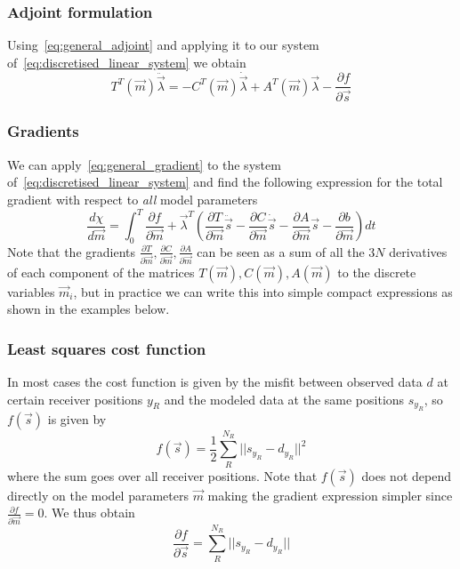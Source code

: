 \documentclass[fleqn,11pt]{SelfArx} %
\newcommand{\pder}[2][]{\frac{\partial#1}{\partial#2}}
\theoremstyle{definition}
\begin{document}
\subsubsection{Adjoint formulation}
Using~\cref{eq:general_adjoint} and applying it to our system of~\cref{eq:discretised_linear_system} we obtain
\begin{equation}\label{eq:adjoint_discretised_linear}
T^T\left(\vec{m}\right) \ddot{\vec{\lambda}} = -C^T\left(\vec{m}\right)\dot{\vec{\lambda}} + A^T\left(\vec{m}\right) \vec{\lambda} - \pder[f]{\vec{s}}
\end{equation}


\subsubsection{Gradients}
We can apply~\cref{eq:general_gradient} to the system of~\cref{eq:discretised_linear_system} and find the following expression for the total gradient with respect to \emph{all} model parameters
\begin{equation}\label{eq:gradient_discretised_linear}
\frac{d\chi}{d\vec{m}} = \int_0^T \pder[f]{\vec{m}} + \vec{\lambda}^T \left(\pder[T]{\vec{m}}\ddot{\vec{s}} - \pder[C]{\vec{m}}\dot{\vec{s}} - \pder[A]{\vec{m}}\vec{s} -\pder[b]{\vec{m}}\right) dt
\end{equation}
Note that the gradients $\pder[T]{\vec{m}}, \pder[C]{\vec{m}}, \pder[A]{\vec{m}}$ can be seen as a sum of all the $3N$ derivatives of each component of the matrices $T\left(\vec{m}\right), C\left(\vec{m}\right), A\left(\vec{m}\right)$ to the discrete variables $\vec{m}_i$, but in practice we can write this into simple compact expressions as shown in the examples below.



\subsubsection{Least squares cost function}
In most cases the cost function is given by the misfit between observed data $d$ at certain receiver positions $y_R$ and the modeled data at the same positions $s_{y_R}$, so $f\left(\vec{s}\right)$ is given by 
\begin{equation}\label{eq:cost_function_standard}
f\left(\vec{s}\right) =\frac{1}{2} \sum_{R}^{N_R}||s_{y_R} - d_{y_R}||^2
\end{equation}
where the sum goes over all receiver positions. Note that $f\left(\vec{s}\right)$ does not depend directly on the model parameters $\vec{m}$ making the gradient expression simpler since $\pder[f]{\vec{m}} = 0$. We thus obtain
\begin{equation}
\pder[f]{\vec{s}} =  \sum_{R}^{N_R}||s_{y_R} - d_{y_R}|| 
\end{equation}
\end{document}

